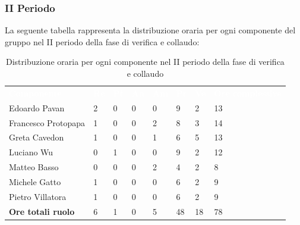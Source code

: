 \subsubsection{II Periodo}
La seguente tabella rappresenta la distribuzione oraria per ogni componente del gruppo nel II periodo della fase di verifica e collaudo:
\begin{table}[H]
\begin{center}
\renewcommand{\arraystretch}{1.25}
\begin{tabular}{ m{}<{\centering}  m{}<{\centering} m{}<{\centering} m{}<{\centering}  m{}<{\centering}  m{}<{\centering}  m{}<{\centering}  m{}<{\centering}   }
	\rowcolor{darkblue}
	\textcolor{white}{\textbf{Componente}} &\textcolor{white}{\textbf{Re}}&\textcolor{white}{\textbf{Pt}}&\textcolor{white}{\textbf{An}}&\textcolor{white}{\textbf{Am}}&\textcolor{white}{\textbf{Pr}}&\textcolor{white}{\textbf{Ve}}&\textcolor{white}{\textbf{Ore complessive}}\\ 
	Edoardo Pavan & 2 & 0 & 0 & 0 & 9 & 2 & 13 \\	
	
	Francesco Protopapa & 1 & 0 & 0 & 2 & 8 & 3 & 14 \\

	Greta Cavedon & 1 & 0 & 0 & 1 & 6 & 5 & 13 \\
	
	Luciano Wu & 0 & 1 & 0 & 0 & 9 & 2 & 12 \\
	
	Matteo Basso & 0 & 0 & 0 & 2 & 4 & 2 & 8 \\
	
	Michele Gatto & 1 & 0 & 0 & 0 & 6 & 2 & 9 \\
	
	Pietro Villatora & 1 & 0 & 0 & 0 & 6 & 2 & 9 \\
	
	\textbf{Ore totali ruolo} & 6 & 1 & 0 & 5 & 48 & 18 & 78 \\

\end{tabular}
\caption{Distribuzione oraria per ogni componente nel II periodo della fase di verifica e collaudo}
\end{center}
\end{table}

